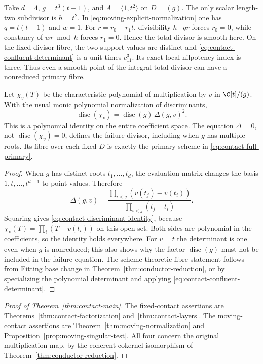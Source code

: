 \begin{remark}
\label{rem:contact-smooth-total-triple-fibre}
Take $d=4$, $g=t^3(t-1)$, and $A=\langle1,t^2\rangle$ on
$D=(g)$. The only scalar length-two subdivisor is $h=t^2$.
In \eqref{eq:moving-explicit-normalization} one has
$q=t(t-1)$ and $w=1$. For $r=r_0+r_1t$, divisibility
$h\mid qr$ forces $r_0=0$, while constancy of $wr\bmod h$
forces $r_1=0$. Hence the total divisor is smooth here. On the
fixed-divisor fibre, the two support values are distinct and
\eqref{eq:contact-confluent-determinant} is a unit times $c_{11}^3$.
Its exact local nilpotency index is three. Thus even a smooth point
of the integral total divisor can have a nonreduced primary fibre.
\end{remark}

\begin{proposition}
\label{prop:contact-discriminant}
Let $\chi_v(T)$ be the characteristic polynomial of multiplication
by $v$ in $\C[t]/(g)$. With the usual monic polynomial
normalization of discriminants,
\begin{equation}\label{eq:contact-discriminant-identity}
 \operatorname{disc}(\chi_v)=
                     \operatorname{disc}(g)\,\Delta(g,v)^2.
\end{equation}
This is a polynomial identity on the entire coefficient space.
The equation $\Delta=0$, not $\operatorname{disc}(\chi_v)=0$,
defines the failure divisor, including when $g$ has multiple roots.
Its fibre over each fixed $D$ is exactly the primary scheme in
\eqref{eq:contact-full-primary}.
\end{proposition}
\begin{proof}
When $g$ has distinct roots $t_1,\ldots,t_d$, the evaluation
matrix changes the basis $1,t,\ldots,t^{d-1}$ to point values.
Therefore
\[
 \Delta(g,v)=\frac{\prod_{i<j}(v(t_j)-v(t_i))}
                   {\prod_{i<j}(t_j-t_i)}.
\]
Squaring gives \eqref{eq:contact-discriminant-identity}, because
$\chi_v(T)=\prod_i(T-v(t_i))$ on this open set. Both sides are
polynomial in the coefficients, so the identity holds everywhere.
For $v=t$ the determinant is one even when $g$ is nonreduced; this
also shows why the factor $\operatorname{disc}(g)$ must not be
included in the failure equation. The scheme-theoretic fibre
statement follows from Fitting base change in
Theorem~\ref{thm:conductor-reduction}, or by specializing the
polynomial determinant and applying
\eqref{eq:contact-confluent-determinant}.
\end{proof}

\begin{proof}[Proof of Theorem~\ref{thm:contact-main}]
The fixed-contact assertions are
Theorems~\ref{thm:contact-factorization} and~\ref{thm:contact-layers}.
The moving-contact assertions are
Theorem~\ref{thm:moving-normalization} and
Proposition~\ref{prop:moving-singular-test}. All four concern the
original multiplication map, by the coherent cokernel isomorphism
of Theorem~\ref{thm:conductor-reduction}.
\end{proof}
